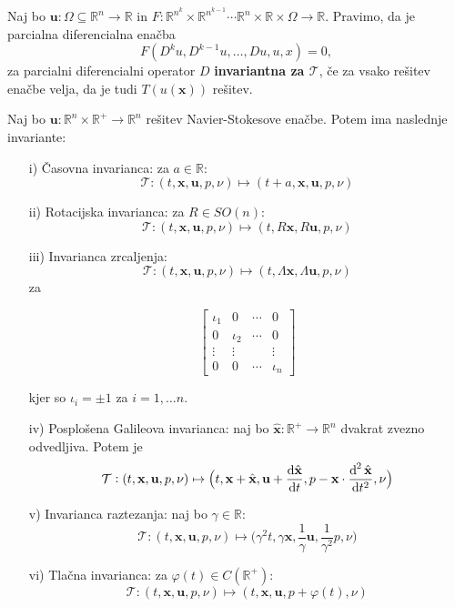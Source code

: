 \documentclass[mat2, tisk]{fmfdelo}
\newcommand{\R}{\mathbb R}
\newcommand{\bd}{\textbf}
\begin{document}
\begin{definicija}
Naj bo $\bd{u}: \Omega \subseteq \R^n \rightarrow \R$ in 
$F: \R^{n^k} \times \R^{n^{k-1}} \cdots \R^n \times \R \times \Omega \rightarrow \R$. 
Pravimo, da je parcialna diferencialna enačba 
$$
F(D^k u, D^{k-1}u, \dots, D u, u, x) = 0,
$$
za parcialni diferencialni operator $D$ \bd{invariantna za $\mathcal{T}$}, če za 
vsako rešitev enačbe velja, da je tudi $T(u(\bd{x}))$ rešitev.
\end{definicija}

\begin{trditev}
Naj bo $\bd{u}: \R^n \times \R^+ \rightarrow \R^n$ rešitev Navier-Stokesove enačbe. 
Potem ima naslednje invariante: 
\begin{enumerate}
  \item[i)] Časovna invarianca: za $a\in \R$: $$\mathcal{T}: (t, \bd{x}, \bd{u}, p, \nu) \mapsto (t + a, \bd{x}, \bd{u}, p, \nu)$$
  \item[ii)] Rotacijska invarianca: za $R \in SO(n)$: $$\mathcal{T}: (t, \bd{x}, \bd{u}, p, \nu) \mapsto (t, R\bd{x}, R\bd{u}, p, \nu)$$
  \item[iii)] Invarianca zrcaljenja: $$ \mathcal{T}: (t, \bd{x}, \bd{u}, p, \nu) \mapsto (t, \Lambda\bd{x}, \Lambda \bd{u}, p, \nu)$$
  za 

\[ \begin{bmatrix}
   \iota_1 & 0 & \cdots & 0 \\
   0 & \iota_2 & \cdots & 0 \\
   \vdots  & \vdots  &  & \vdots  \\
   0 & 0 & \cdots & \iota_n
 \end{bmatrix} \]

 kjer so $\iota_i = \pm 1$ za $i = 1, \dots n$.
  \item[iv)] Posplošena Galileova invarianca: naj bo $\hat{\bd{x}}: \R^+ \rightarrow \R^n$ dvakrat zvezno odvedljiva. Potem je 
  $$\mathcal{T}: (t, \bd{x}, \bd{u}, p, \nu) \mapsto \big(t, \bd{x} + \hat{\bd{x}}, \bd{u} + \frac{\dif \hat{\bd{x}}}{\dif t}, p - \bd{x} \cdot \frac{\dif^{\,2} \hat{\bd{x}}}{\dif t^2}, \nu\big)$$
  \item[v)] Invarianca raztezanja: naj bo $\gamma\in \R$: 
  $$\mathcal{T}: (t, \bd{x}, \bd{u}, p, \nu) \mapsto \big(\gamma^2 t, \gamma\bd{x}, \frac{1}{\gamma} \bd{u}, \frac{1}{\gamma^2} p, \nu\big)$$
  \item[vi)] Tlačna invarianca: za $\varphi(t) \in C(\R^+)$: 
  $$\mathcal{T}: (t, \bd{x}, \bd{u}, p, \nu) \mapsto (t, \bd{x}, \bd{u}, p + \varphi(t), \nu) $$
\end{enumerate}
\end{trditev}
\end{document}
